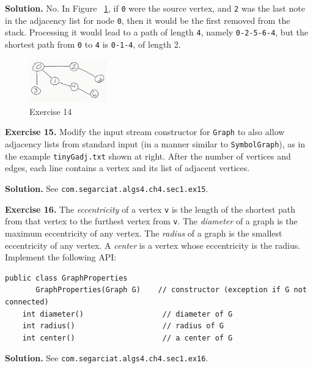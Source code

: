 \documentclass[12pt, a4paper]{article}
\newenvironment{ex}[2][Exercise]
{\par\medskip\noindent \textbf{#1 #2.}}
{\medskip}
\newenvironment{sol}[1][Solution]
{\par\medskip\noindent \textbf{#1.} }
{\medskip}
\begin{document}
	\begin{sol}
		No. In Figure ~\ref{fig:ex-14}, if \texttt{0} were the source vertex, and
		\texttt{2} was the last note in the adjacency list for node \texttt{0},
		then it would be the first removed from the stack. Processing it would lead to
		a path of length \texttt{4}, namely \texttt{0-2-5-6-4}, but the shortest path
		from \texttt{0} to \texttt{4} is \texttt{0-1-4}, of length 2.
		\begin{figure}
			\centering
			\includegraphics[width=0.3\textwidth]{exercise-14}
			\caption{Exercise 14}
			\label{fig:ex-14}
		\end{figure}
	\end{sol}
	\begin{ex}{15}
		Modify the input stream constructor for \texttt{Graph} to also allow adjacency
		lists from standard input (in a manner similar to \texttt{SymbolGraph}), as in
		the example \texttt{tinyGadj.txt} shown at right. After the number of vertices
		and edges, each line contains a vertex and its list of adjacent vertices.
	\end{ex}
	\begin{sol}
		See \texttt{com.segarciat.algs4.ch4.sec1.ex15}.
	\end{sol}
	\begin{ex}{16}
		The \emph{eccentricity} of a vertex \texttt{v} is the length of the shortest path
		from that vertex to the furthest vertex from \texttt{v}. The \emph{diameter} of a
		graph is the maximum eccentricity of any vertex. The \emph{radius} of a graph is the
		smallest eccentricity of any vertex. A \emph{center} is a vertex whose eccentricity is
		the radius. Implement the following API:
		
		\begin{lstlisting}[language={}]
public class GraphProperties
       GraphProperties(Graph G)    // constructor (exception if G not connected)
	int diameter()                  // diameter of G
	int radius()                    // radius of G
	int center()                    // a center of G	
		\end{lstlisting}

	\end{ex}
	\begin{sol}
		See \texttt{com.segarciat.algs4.ch4.sec1.ex16}.
	\end{sol}
\end{document}
